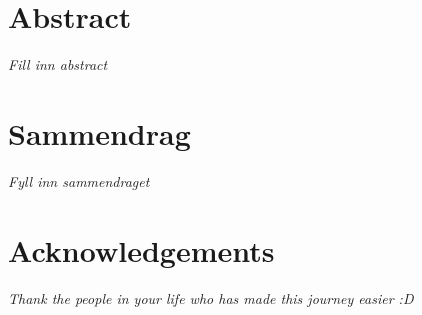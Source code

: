 \documentclass[../thesis.tex]{subfiles}
\begin{document}
    \section*{Abstract}
        \textit{Fill inn abstract}

    \section*{Sammendrag}
        \textit{Fyll inn sammendraget}

    \section*{Acknowledgements}
        \textit{Thank the people in your life who has made this journey easier :D}
\end{document}
